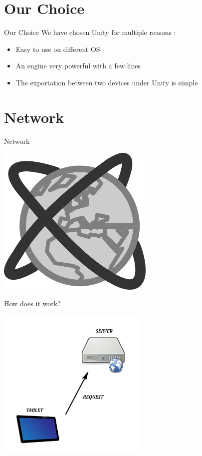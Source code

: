 \documentclass[a4paper,10pt]{beamer}
\begin{document}
	\section{Our Choice}
		
		\begin{frame}{Our Choice}
			We have chosen Unity for multiple reasons :
			\begin{itemize}
				\item Easy to use on different OS
				\item An engine very powerful with a few lines
				\item The exportation between two devices under Unity is simple
			\end{itemize}			
		\end{frame}
		
	\section{Network}
		
		\begin{frame}{Network}
			\centerline{\includegraphics[height=205pt]{images/network.png}}
		\end{frame}
		
		\begin{frame}{How does it work?}
			\centerline{\includegraphics[height=205pt]{images/request.png}}
		\end{frame}
		
\end{document}
